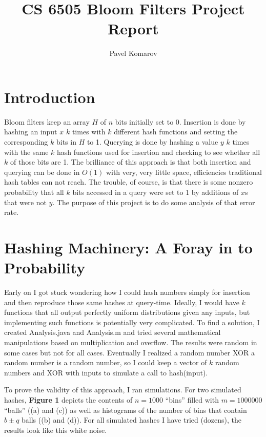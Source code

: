 \documentclass[]{article}
\begin{document}
\title{\vspace{-15mm}CS 6505 Bloom Filters Project Report}
\author{Pavel Komarov}
\maketitle
  
  
  \section{Introduction}
  \vspace{-2mm}
  Bloom filters keep an array $H$ of $n$ bits initially set to 0. Insertion is done by hashing an input $x$ $k$ times with $k$ different hash functions and setting the corresponding $k$ bits in $H$ to 1. Querying is done by hashing a value $y$ $k$ times with the same $k$ hash functions used for insertion and checking to see whether all $k$ of those bits are 1. The brilliance of this approach is that both insertion and querying can be done in $O(1)$ with very, very little space, efficiencies traditional hash tables can not reach. The trouble, of course, is that there is some nonzero probability that all $k$ bits accessed in a query were set to 1 by additions of $x$s that were not $y$. The purpose of this project is to do some analysis of that error rate.
  \vspace{-3mm}

  \section{Hashing Machinery: A Foray in to Probability}
  \vspace{-2mm}
  Early on I got stuck wondering how I could hash numbers simply for insertion and then reproduce those same hashes at query-time. Ideally, I would have $k$ functions that all output perfectly uniform distributions given any inputs, but implementing such functions is potentially very complicated. To find a solution, I created Analysis.java and Analysis.m and tried several mathematical manipulations based on multiplication and overflow. The results were random in some cases but not for all cases. Eventually I realized a random number XOR a random number is a random number, so I could keep a vector of $k$ random numbers and XOR with inputs to simulate a call to hash(input). 
  
  To prove the validity of this approach, I ran simulations. For two simulated hashes, \textbf{Figure 1} depicts the contents of $n = 1000$ ``bins'' filled with $m = 1000000$ ``balls'' ((a) and (c)) as well as histograms of the number of bins that contain $b\pm q$ balls ((b) and (d)). For all simulated hashes I have tried (dozens), the results look like this white noise.
\end{document}
